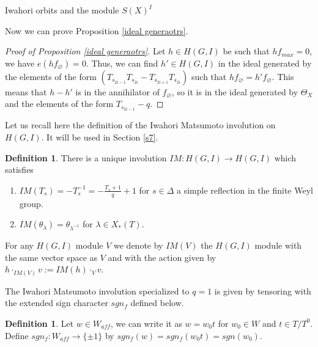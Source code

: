 \documentclass[12pt]{article}
\newcommand{\<}{\langle}
\renewcommand{\>}{\rangle}
\renewcommand{\emptyset}{\varnothing}
\theoremstyle{plain}
\theoremstyle{definition}
\newtheorem{defn}[theorem]{Definition}
\begin{document}
\begin{section}{Iwahori orbits and the module $S(X)^I$}
    
Now we can prove Proposition \ref{ideal generaotrs}.

\begin{proof}[Proof of Proposition \ref{ideal generaotrs}]

Let $h\in H(G,I)$ be such that $hf_{max}=0$, we have $e(hf_\emptyset)=0$. Thus, we can find $h'\in H(G,I)$ in the ideal generated by the elements of the form $(T_{s_{2i-1}}T_{s_{2i}}-T_{s_{2i+1}}T_{s_{2i}})$ such that $hf_\emptyset=h'f_\emptyset$. This means that $h-h'$ is in the annihilator of $f_\emptyset$, so it is in the ideal generated by $\Theta_X$ and the elements of the form $T_{s_{2i-1}}-q$.  
    
\end{proof}
    



Let us recall here the definition of the Iwahori Matsumoto involution on $H(G,I)$. It will be used in Section \ref{s7}.

\begin{defn}\label{involution}
    There is a unique involution $IM:H(G,I)\rightarrow H(G,I)$ which satisfies
    \begin{enumerate}
        \item $IM(T_s)=-T^{-1}_s=-\frac{T_s+1}{q}+1$ for $s\in \Delta$ a simple reflection in the finite Weyl group.
        \item $IM(\theta_\lambda)=\theta_{\lambda^{-1}}$ for $\lambda\in X_*(T)$.
    \end{enumerate}

    For any $H(G,I)$ module $V$ we denote by $IM(V)$ the $H(G,I)$ module with the same vector space as $V$ and with the action given by $h\cdot_{IM(V)} v:=IM(h)\cdot_Vv$.
\end{defn}

The Iwahori Matsumoto involution specialized to $q=1$ is given by tensoring with the extended sign character $sgn_f$ defined below. 


\begin{defn}
    Let $w\in W_{aff}$, we can write it as $w=w_0t$ for $w_0\in W$ and $t\in T/T^0$.
    Define $sgn_f:W_{aff}\rightarrow\{\pm 1\}$ by $sgn_f(w)=sgn_f(w_0t)=sgn(w_0)$.
\end{defn}



    
\end{section}
\end{document}
